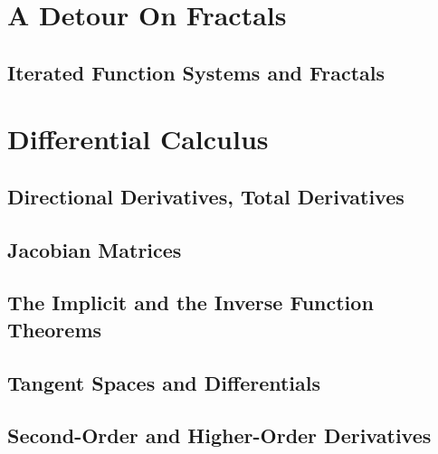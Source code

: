 \documentclass[a4paper]{article}
\begin{document}
\newpage
\section{A Detour On Fractals}
\subsection{ Iterated Function Systems and Fractals} %


\newpage
\section{Differential Calculus}
\subsection{ Directional Derivatives, Total Derivatives} %

\subsection{ Jacobian Matrices} %

\subsection{ The Implicit and the Inverse Function Theorems} %

\subsection{ Tangent Spaces and Differentials} %

\subsection{ Second-Order and Higher-Order Derivatives} %
\end{document}
